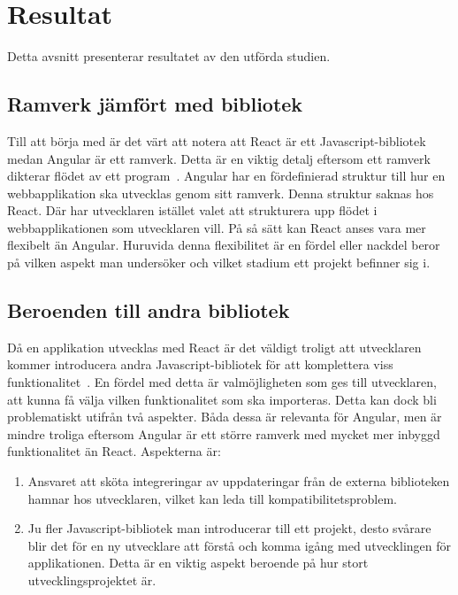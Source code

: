 \section{Resultat}
\label{sec:axel-results}
Detta avsnitt presenterar resultatet av den utförda studien.

\subsection{Ramverk jämfört med bibliotek}
Till att börja med är det värt att notera att React är ett Javascript-bibliotek medan Angular är ett ramverk. Detta är en viktig detalj eftersom ett ramverk dikterar flödet av ett program~\cite{medium}. Angular har en fördefinierad struktur till hur en webbapplikation ska utvecklas genom sitt ramverk. Denna struktur saknas hos React. Där har utvecklaren istället valet att strukturera upp flödet i webbapplikationen som utvecklaren vill. På så sätt kan React anses vara mer flexibelt än Angular. Huruvida denna flexibilitet är en fördel eller nackdel beror på vilken aspekt man undersöker och vilket stadium ett projekt befinner sig i. 

\subsection{Beroenden till andra bibliotek}
\label{beroenden-till-andra-bibliotek}
Då en applikation utvecklas med React är det väldigt troligt att utvecklaren kommer introducera andra Javascript-bibliotek för att komplettera viss funktionalitet~\cite{sitepoint}. En fördel med detta är valmöjligheten som ges till utvecklaren, att kunna få välja vilken funktionalitet som ska importeras. Detta kan dock bli problematiskt utifrån två aspekter. Båda dessa är relevanta för Angular, men är mindre troliga eftersom Angular är ett större ramverk med mycket mer inbyggd funktionalitet än React. Aspekterna är:

\begin{enumerate}
    \item Ansvaret att sköta integreringar av uppdateringar från de externa biblioteken hamnar hos utvecklaren, vilket kan leda till kompatibilitetsproblem.

    \item Ju fler Javascript-bibliotek man introducerar till ett projekt, desto svårare blir det för en ny utvecklare att förstå och komma igång med utvecklingen för applikationen. Detta är en viktig aspekt beroende på hur stort utvecklingsprojektet är.
\end{enumerate}



